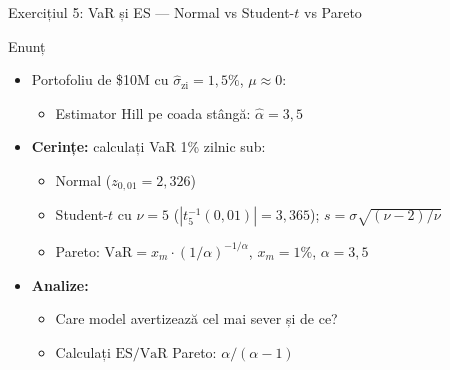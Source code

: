 \documentclass[9pt, aspectratio=169, t]{beamer}
\begin{document}
\begin{frame}[shrink=25]{Exercițiul 5: VaR și ES --- Normal vs Student-$t$ vs Pareto}
\begin{cminipage}{0.95\textwidth}
\begin{block}{Enunț}
\begin{itemize}\setlength{\itemsep}{0pt}
    \item Portofoliu de \$10M cu $\hat\sigma_{\text{zi}} = 1{,}5\%$, $\mu \approx 0$:
    \begin{itemize}\setlength{\itemsep}{0pt}
        \item Estimator Hill pe coada stângă: $\hat\alpha = 3{,}5$
    \end{itemize}
    \item \textbf{Cerințe:} calculați VaR 1\% zilnic sub:
    \begin{itemize}\setlength{\itemsep}{0pt}
        \item Normal ($z_{0{,}01} = 2{,}326$)
        \item Student-$t$ cu $\nu = 5$ ($|t_5^{-1}(0{,}01)| = 3{,}365$); $s = \sigma\sqrt{(\nu-2)/\nu}$
        \item Pareto: $\text{VaR} = x_m \cdot (1/\alpha)^{-1/\alpha}$, $x_m = 1\%$, $\alpha = 3{,}5$
    \end{itemize}
    \item \textbf{Analize:}
    \begin{itemize}\setlength{\itemsep}{0pt}
        \item Care model avertizează cel mai sever și de ce?
        \item Calculați $\text{ES}/\text{VaR}$ Pareto: $\alpha/(\alpha-1)$
    \end{itemize}
\end{itemize}
\end{block}
\end{cminipage}
\end{frame}
\end{document}
